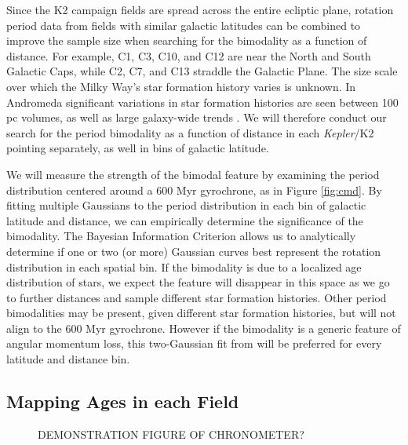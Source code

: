 \documentclass[12pt]{article}
\newcommand{\Kepler}{\textsl{Kepler}\xspace}
\begin{document}
Since the K2 campaign fields are spread across the entire ecliptic plane, rotation period data from fields with similar galactic latitudes can be combined to improve the sample size when searching for the bimodality as a function of distance. For example, C1, C3, C10, and C12 are near the North and South Galactic Caps, while C2, C7, and C13 straddle the Galactic Plane. The size scale over which the Milky Way's star formation history varies is unknown. In Andromeda significant variations in star formation histories are seen between 100 pc volumes, as well as large galaxy-wide trends \citep[e.g.][]{lewis2015}. We will therefore conduct our search for the period bimodality as a function of distance in each \Kepler/K2 pointing separately, as well in bins of galactic latitude.


We will measure the strength of the bimodal feature by examining the period distribution centered around a 600 Myr gyrochrone, as in Figure \ref{fig:cmd}. By fitting multiple Gaussians to the period distribution in each bin of galactic latitude and distance, we can empirically determine the significance of the bimodality. The Bayesian Information Criterion allows us to analytically determine if one or two (or more) Gaussian curves best represent the rotation distribution in each spatial bin. 
 If the bimodality is due to a localized age distribution of stars, we expect the feature will disappear in this space as we go to further distances and sample different star formation histories. Other period bimodalities may be present, given different star formation histories, but will not align to the 600 Myr gyrochrone. However if the bimodality is a generic feature of angular momentum loss, this two-Gaussian fit from \citet{davenport2017} will be preferred for every latitude and distance bin.






\subsection{Mapping Ages in each Field}

\begin{figure}[!th]
\centering
\fbox{\rule{3in}{0pt}\rule[-0.5ex]{0pt}{24ex}} 
\caption{
DEMONSTRATION FIGURE OF CHRONOMETER? 
}
\label{fig:chrono}
\end{figure}
\end{document}

